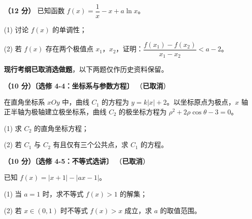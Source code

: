 \begin{question}
\textbf{（12 分）} 已知函数 $f(x)=\dfrac1x-x+a\ln x$。

  (1) 讨论 $f(x)$ 的单调性；

  (2) 若 $f(x)$ 存在两个极值点 $x_1$，$x_2$，证明：$\dfrac{f\left(x_1\right)-f\left(x_2\right)}{x_1-x_2}<a-2$。

\par\medskip

\end{question}

\begin{gktip}
\textbf{ 现行考纲已取消选做题}，以下两题仅作历史资料保留。
\end{gktip}

\begin{question}
\textbf{（10 分）〔选修 4-4：坐标系与参数方程〕} （\textbf{已取消}）

在直角坐标系 $xOy$ 中，曲线 $C_1$ 的方程为 $y=k|x|+2$。以坐标原点为极点，$x$ 轴正半轴为极轴建立极坐标系，曲线 $C_2$ 的极坐标方程为 $\rho^{2}+2\rho\cos\theta-3=0$。

  (1) 求 $C_2$ 的直角坐标方程；

  (2) 若 $C_1$ 与 $C_2$ 有且仅有三个公共点，求 $C_1$ 的方程。

\end{question}
\begin{question}
\textbf{（10 分）〔选修 4-5：不等式选讲〕} （\textbf{已取消}）

已知 $f(x)=|x+1|-|ax-1|$。

  (1) 当 $a=1$ 时，求不等式 $f(x)>1$ 的解集；

  (2) 若 $x\in(0,1)$ 时不等式 $f(x)>x$ 成立，求 $a$ 的取值范围。

\par\medskip


\end{question}